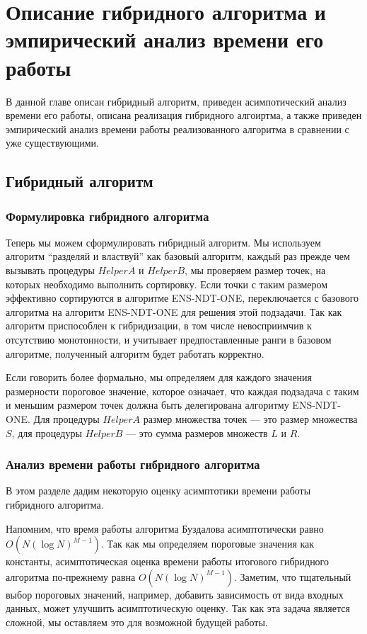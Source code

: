 \chapter{Описание гибридного алгоритма и эмпирический анализ времени его работы}
\label{chapter4}

В данной главе описан гибридный алгоритм, приведен асимпотический анализ времени его работы, описана реализация гибридного алгоиртма, а также приведен эмпирический анализ времени работы реализованного алгоритма в сравнении с уже существующими.

\section{Гибридный алгоритм}

\subsection{Формулировка гибридного алгоритма}

Теперь мы можем сформулировать гибридный алгоритм. Мы используем алгоритм ``разделяй и властвуй'' как базовый алгоритм, каждый раз прежде чем вызывать процедуры $HelperA$ и $HelperB$, мы проверяем размер точек, на которых необходимо выполнить сортировку. Если точки с таким размером эффективно сортируются в алгоритме ENS-NDT-ONE, переключается с базового алгоритма на алгоритм ENS-NDT-ONE для решения этой подзадачи. Так как алгоритм приспособлен к гибридизации, в том числе невосприимчив к отсутствию монотонности, и учитывает предпоставленные ранги в базовом алгоритме, полученный алгоритм будет работать корректно.

Если говорить более формально, мы определяем для каждого значения размерности пороговое значение, которое означает, что каждая подзадача с таким и меньшим размером точек должна быть делегирована алгоритму ENS-NDT-ONE. Для процедуры $HelperA$ размер множества точек {---} это размер множества $S$, для процедуры $HelperB$ {---} это сумма размеров множеств $L$ и $R$.

\subsection{Анализ времени работы гибридного алгоритма}

В этом разделе дадим некоторую оценку асимптотики времени работы гибридного алгоритма.

Напомним, что время работы алгоритма Буздалова асимптотически равно $O(N(\log N)^{M-1})$. Так как мы определяем пороговые значения как константы, асимптотическая оценка времени работы итогового гибридного  алгоритма по-прежнему равна $O(N(\log N)^{M-1})$. Заметим, что тщательный выбор пороговых значений, например, добавить зависимость от вида входных данных, может улучшить асимптотическую оценку. Так как эта задача является сложной, мы оставляем это для возможной будущей работы.

